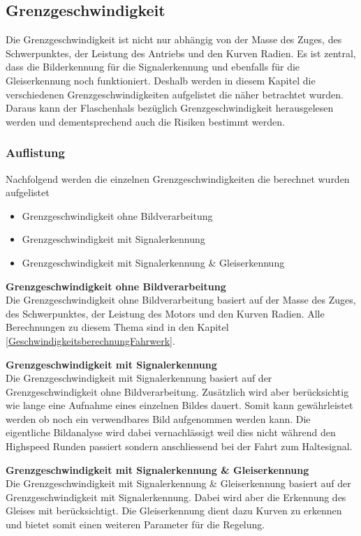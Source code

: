 \documentclass[../../main.tex]{subfiles}
\begin{document}
\subsection{Grenzgeschwindigkeit}
Die Grenzgeschwindigkeit ist nicht nur abhängig von der Masse des Zuges, des Schwerpunktes, der Leistung des Antriebs und den Kurven Radien.
Es ist zentral, dass die Bilderkennung für die Signalerkennung und ebenfalls für die Gleiserkennung noch funktioniert.
Deshalb werden in diesem Kapitel die verschiedenen Grenzgeschwindigkeiten aufgelistet die näher betrachtet wurden.
Daraus kann der Flaschenhals bezüglich Grenzgeschwindigkeit herausgelesen werden und dementsprechend auch die Risiken
bestimmt werden.

\subsubsection{Auflistung}
Nachfolgend werden die einzelnen Grenzgeschwindigkeiten die berechnet wurden aufgelistet
\begin{itemize} %
    \item Grenzgeschwindigkeit ohne Bildverarbeitung
    \item Grenzgeschwindigkeit mit Signalerkennung
    \item Grenzgeschwindigkeit mit Signalerkennung \& Gleiserkennung
\end{itemize}

\textbf{Grenzgeschwindigkeit ohne Bildverarbeitung} \\
Die Grenzgeschwindigkeit ohne Bildverarbeitung basiert auf der Masse des Zuges, des Schwerpunktes, der Leistung des Motors und den Kurven Radien.
Alle Berechnungen zu diesem Thema sind in den Kapitel \ref{GeschwindigkeitsberechnungFahrwerk}.

\textbf{Grenzgeschwindigkeit mit Signalerkennung} \\
Die Grenzgeschwindigkeit mit Signalerkennung basiert auf der Grenzgeschwindigkeit ohne Bildverarbeitung. Zusätzlich wird aber berücksichtig wie lange eine
Aufnahme eines einzelnen Bildes dauert. Somit kann gewährleistet werden ob noch ein verwendbares Bild aufgenommen werden kann. Die eigentliche Bildanalyse
wird dabei vernachlässigt weil dies nicht während den Highspeed Runden passiert sondern anschliessend bei der Fahrt zum Haltesignal.

\textbf{Grenzgeschwindigkeit mit Signalerkennung \& Gleiserkennung} \\
Die Grenzgeschwindigkeit mit Signalerkennung \& Gleiserkennung basiert auf der Grenzgeschwindigkeit mit Signalerkennung. Dabei wird aber die Erkennung des Gleises
mit berücksichtigt. Die Gleiserkennung dient dazu Kurven zu erkennen und bietet somit einen weiteren Parameter für die Regelung.
\end{document}
